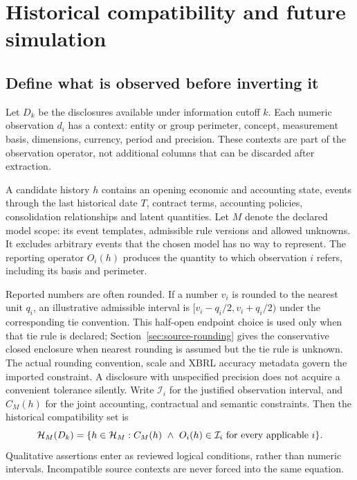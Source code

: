 \chapter{Historical compatibility and future simulation}
\label{ch:math}

\section{Define what is observed before inverting it}

Let $D_k$ be the disclosures available under information cutoff $k$. Each
numeric observation $d_i$ has a context: entity or group perimeter, concept,
measurement basis, dimensions, currency, period and precision. These contexts
are part of the observation operator, not additional columns that can be
discarded after extraction.

A candidate history $h$ contains an opening economic and accounting state,
events through the last historical date $T$, contract terms, accounting
policies, consolidation relationships and latent quantities. Let $M$ denote
the declared model scope: its event templates, admissible rule versions and
allowed unknowns. It excludes arbitrary events that the chosen model has no
way to represent. The reporting operator $O_i(h)$ produces the quantity to
which observation $i$ refers, including its basis and perimeter.

Reported numbers are often rounded. If a number $v_i$ is rounded to the nearest
unit $q_i$, an illustrative admissible interval is
$[v_i-q_i/2,v_i+q_i/2)$ under the corresponding tie convention. This
half-open endpoint choice is used only when that tie rule is declared;
Section~\ref{sec:source-rounding} gives the conservative closed enclosure when
nearest rounding is assumed but the tie rule is unknown. The actual
rounding convention, scale and XBRL accuracy metadata govern the imported
constraint. A disclosure with unspecified precision does not acquire a
convenient tolerance silently. Write $\mathcal{I}_i$ for the justified
observation interval, and $C_M(h)$ for the joint accounting, contractual and
semantic constraints. Then the historical compatibility set is
\begin{equation}\label{eq:histset}
 \mathcal{H}_M(D_k)=\{h\in\mathcal{H}_M:
 C_M(h)\ \land\ O_i(h)\in\mathcal{I}_i\text{ for every applicable }i\}.
\end{equation}
Qualitative assertions enter as reviewed logical conditions, rather than
numeric intervals. Incompatible source contexts are never forced into the
same equation.

